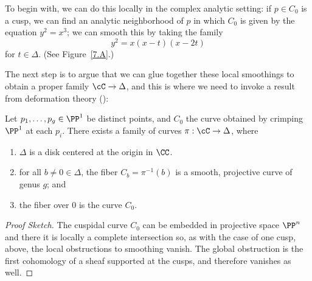 To begin with, we can do this locally in the complex analytic setting: if $p \in C_0$ is a cusp, we can find an analytic neighborhood of $p$ in which $C_0$ is given by the equation $y^2 = x^3$; we can smooth this by taking the family
$$
y^2 = x(x-t)(x-2t)
$$
for $t\in \Delta$.
(See Figure~\ref{7.A}.)

The next step is to argue that we can glue together these local smoothings to obtain a proper family $\cC \to \Delta$, and this is where we need to invoke a result from deformation theory (\cite{MR2223408}):

\begin{lemma}\label{specialization to cuspidal curve}
Let $p_1,\dots,p_g \in \PP^1$ be distinct points, and $C_0$ the curve obtained by 
crimping $\PP^1$ at each $p_i$. There exists a family of curves $\pi : \cC \to \Delta$, where
\begin{enumerate}
\item $\Delta$ is a disk centered at the origin in $\CC$.
\item for all $b \neq 0 \in \Delta$, the fiber $C_b = \pi^{-1}(b)$ is a smooth, projective curve of genus $g$;  and
\item the fiber over $0$ is the curve $C_0$.
\end{enumerate}
\end{lemma}

\begin{proof}[Proof Sketch]
The cuspidal curve $C_{0}$ can be embedded in projective space $\PP^{n}$ and there
it is locally a complete intersection so, as with the case of one cusp, above, the local obstructions
to smoothing vanish. The global obstruction is the first cohomology of a sheaf supported at the cusps,
and therefore vanishes as well.
\end{proof}


